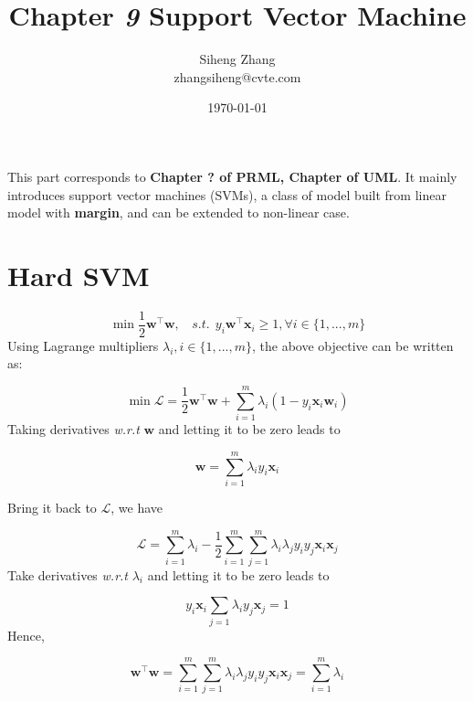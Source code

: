 \documentclass{article}
\author{Siheng Zhang\\zhangsiheng@cvte.com}
\title{Chapter \textbf{\textit{9}} Support Vector Machine}
\date{\today}
\begin{document}
\maketitle  

This part corresponds to \textbf{Chapter ? of PRML, Chapter of UML}. It mainly introduces support vector machines (SVMs), a class of model built from linear model with \textbf{margin}, and can be extended to non-linear case.

\tableofcontents
\newpage

\section{Hard SVM}

	\begin{equation}
	\min \frac{1}{2} \mathbf{w}^\top \mathbf{w},\ \ \ \ \textit{s.t.}\ \ y_i\mathbf{w}^\top \mathbf{x}_i \geq 1, \forall i\in\{1,...,m\}
	\end{equation}
Using Lagrange multipliers $\lambda_i,  i\in\{1,...,m\}$, the above objective can be written as:

	\begin{equation*}
	\min \mathcal{L} =  \frac{1}{2} \mathbf{w}^\top \mathbf{w} + \sum_{i=1}^m \lambda_i(1-y_i \mathbf{x}_i \mathbf{w}_i)
	\end{equation*}
Taking derivatives \textit{w.r.t} $\mathbf{w}$ and letting it to be zero leads to

	\begin{equation*}
	\mathbf{w} = \sum_{i=1}^m \lambda_i y_i \mathbf{x}_i
	\end{equation*}

Bring it back to $\mathcal{L}$, we have

	\begin{equation*}
	\mathcal{L} = \sum_{i=1}^m \lambda_i - \frac{1}{2}\sum_{i=1}^m\sum_{j=1}^m \lambda_i \lambda_j y_i y_j \mathbf{x}_i \mathbf{x}_j
	\end{equation*}
Take derivatives \textit{w.r.t} $\lambda_i$ and letting it to be zero leads to 

	\begin{equation*}
	y_i \mathbf{x}_i \sum_{j=1} \lambda_i y_j \mathbf{x}_j=1
	\end{equation*}
Hence, 

	\begin{equation*}
	\mathbf{w}^\top \mathbf{w} = \sum_{i=1}^m\sum_{j=1}^m \lambda_i \lambda_j y_i y_j \mathbf{x}_i \mathbf{x}_j = \sum_{i=1}^m \lambda_i
	\end{equation*}
\end{document}
